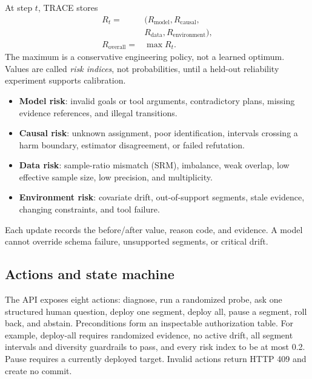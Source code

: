 \documentclass[11pt,twocolumn]{article}
\begin{document}
At step $t$, TRACE stores
\begin{align*}
R_t={}&(R_{\mathrm{model}},R_{\mathrm{causal}},\\
&R_{\mathrm{data}},R_{\mathrm{environment}}),\\
R_{\mathrm{overall}}={}&\max R_t.
\end{align*}
The maximum is a conservative engineering policy, not a learned optimum. Values are called \emph{risk indices}, not probabilities, until a held-out reliability experiment supports calibration.

\begin{itemize}
  \item \textbf{Model risk}: invalid goals or tool arguments, contradictory plans, missing evidence references, and illegal transitions.
  \item \textbf{Causal risk}: unknown assignment, poor identification, intervals crossing a harm boundary, estimator disagreement, or failed refutation.
  \item \textbf{Data risk}: sample-ratio mismatch (SRM), imbalance, weak overlap, low effective sample size, low precision, and multiplicity.
  \item \textbf{Environment risk}: covariate drift, out-of-support segments, stale evidence, changing constraints, and tool failure.
\end{itemize}

Each update records the before/after value, reason code, and evidence. A model cannot override schema failure, unsupported segments, or critical drift.

\subsection{Actions and state machine}

The API exposes eight actions: diagnose, run a randomized probe, ask one structured human question, deploy one segment, deploy all, pause a segment, roll back, and abstain. Preconditions form an inspectable authorization table. For example, deploy-all requires randomized evidence, no active drift, all segment intervals and diversity guardrails to pass, and every risk index to be at most 0.2. Pause requires a currently deployed target. Invalid actions return HTTP 409 and create no commit.

\begin{center}
\end{center}
\end{document}
